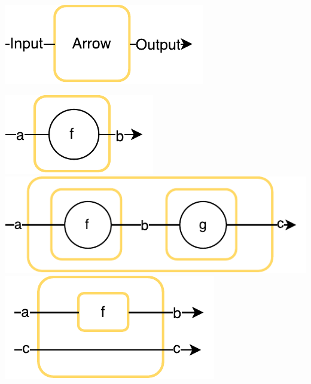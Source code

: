 \documentclass{standalone}[pstricks,border=12pt]
\begin{document}
    \centering
    \parbox[c][17em]{0.49\linewidth}{%
    \vfill
    \centering
        \includegraphics{src/images/arrow}
    \vfill
    }
    \parbox[c][17em]{0.49\linewidth}{%
    \vfill
    \centering
        {\includegraphics[scale=0.6]{src/images/arr}}
        {\includegraphics[scale=0.6]{src/images/compose}}
        {\includegraphics[scale=0.6]{src/images/first}}
    \vfill
    }
\end{document}
